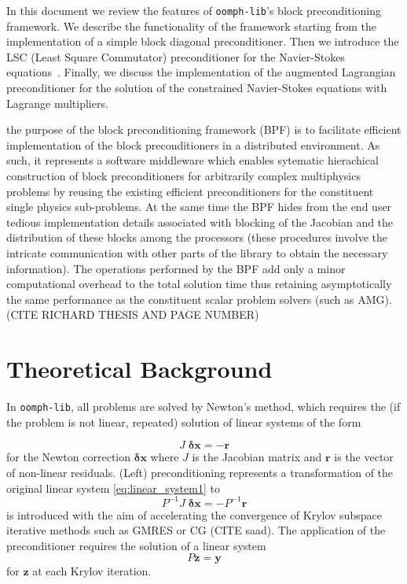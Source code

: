 In this document we review the features of \texttt{oomph-lib}'s block 
preconditioning framework. We describe the functionality of the 
framework starting from the implementation of a simple block diagonal 
preconditioner. Then we introduce the LSC (Least Square Commutator) 
preconditioner for the Navier-Stokes equations~\cite{fastiterativesolvers}. 
Finally, we discuss the implementation of the augmented Lagrangian 
preconditioner for the solution of the constrained Navier-Stokes equations with
Lagrange multipliers.

the purpose of the block preconditioning framework (BPF) is to facilitate 
efficient implementation of the block preconditioners in a distributed 
environment. As such, it represents a software middleware which enables 
sytematic hierachical construction of block preconditioners for arbitrarily 
complex multiphysics problems by reusing the existing efficient preconditioners
for the constituent single physics sub-problems. At the same time the BPF hides
from the end user tedious implementation details associated with blocking of 
the Jacobian and the distribution of these blocks among the processors (these 
procedures involve the intricate communication with other parts of the library 
to obtain the necessary information). The operations performed by the BPF add 
only a minor computational overhead to the total solution time thus retaining 
asymptotically the same performance as the constituent scalar problem solvers 
(such as AMG). (CITE RICHARD THESIS AND PAGE NUMBER)

\section{ Theoretical Background\label{sec:theoretical_background}}
In \texttt{oomph-lib}, all problems are solved by Newton's method, which requires
the (if the problem is not linear, repeated) solution of linear systems of the 
form

\begin{equation}
J\;\mathbf{\delta x} = -\mathbf{r}
\label{eq:linear_system1}
\end{equation}
for the Newton correction $\mathbf{\delta x}$ where $J$ is the
Jacobian matrix and $\mathbf{r}$ is the vector of non-linear residuals. (Left) 
preconditioning represents a transformation of the original linear system 
\eqref{eq:linear_system1} to
\begin{equation*}
P^{-1}J\;\mathbf{ \delta x}=-P^{-1}\mathbf{r}
\end{equation*}
is introduced with the aim of accelerating the convergence of Krylov subspace 
iterative methods such as GMRES or CG (CITE saad). The application of the 
preconditioner requires the solution of a linear system
\begin{equation*}
P\mathbf{z}=\mathbf{y}
\end{equation*}
for $\mathbf{z}$ at each Krylov iteration.

